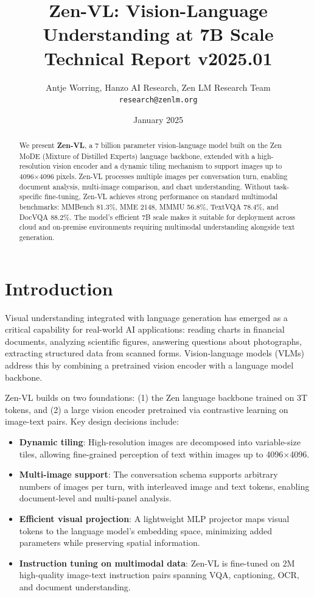 \documentclass[11pt,a4paper]{article}
\title{\textbf{Zen-VL: Vision-Language Understanding at 7B Scale}\\
\large Technical Report v2025.01}
\author{Antje Worring, Hanzo AI Research, Zen LM Research Team\\
\texttt{research@zenlm.org}}
\date{January 2025}
\begin{document}
\maketitle

\begin{abstract}
We present \textbf{Zen-VL}, a 7 billion parameter vision-language model built on the Zen MoDE
(Mixture of Distilled Experts) language backbone, extended with a high-resolution vision encoder
and a dynamic tiling mechanism to support images up to 4096$\times$4096 pixels. Zen-VL processes
multiple images per conversation turn, enabling document analysis, multi-image comparison, and
chart understanding. Without task-specific fine-tuning, Zen-VL achieves strong performance on
standard multimodal benchmarks: MMBench 81.3\%, MME 2148, MMMU 56.8\%, TextVQA 78.4\%, and
DocVQA 88.2\%. The model's efficient 7B scale makes it suitable for deployment across cloud and
on-premise environments requiring multimodal understanding alongside text generation.
\end{abstract}

\tableofcontents
\newpage

\section{Introduction}

Visual understanding integrated with language generation has emerged as a critical capability
for real-world AI applications: reading charts in financial documents, analyzing scientific
figures, answering questions about photographs, extracting structured data from scanned forms.
Vision-language models (VLMs) \cite{radford2021clip, li2023blip2, liu2023llava} address this
by combining a pretrained vision encoder with a language model backbone.

Zen-VL builds on two foundations: (1) the Zen language backbone trained on 3T tokens, and (2)
a large vision encoder pretrained via contrastive learning on image-text pairs. Key design
decisions include:

\begin{itemize}
  \item \textbf{Dynamic tiling}: High-resolution images are decomposed into variable-size
        tiles, allowing fine-grained perception of text within images up to 4096$\times$4096.
  \item \textbf{Multi-image support}: The conversation schema supports arbitrary numbers of
        images per turn, with interleaved image and text tokens, enabling document-level and
        multi-panel analysis.
  \item \textbf{Efficient visual projection}: A lightweight MLP projector maps visual tokens
        to the language model's embedding space, minimizing added parameters while preserving
        spatial information.
  \item \textbf{Instruction tuning on multimodal data}: Zen-VL is fine-tuned on 2M high-quality
        image-text instruction pairs spanning VQA, captioning, OCR, and document understanding.
\end{itemize}
\end{document}
